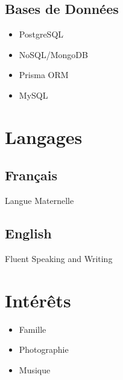 \documentclass{article}
\begin{document}
\begin{paracol}{2}
\begin{leftcolumn}
    \subsection{Bases de Données}
    \begin{itemize}
      \item PostgreSQL
      \item NoSQL/MongoDB
      \item Prisma ORM
      \item MySQL
    \end{itemize}

    \section{Langages}

    \subsection{Français}
    Langue Maternelle

    \vspace{0.5em}

    \subsection{English}
    Fluent Speaking and Writing

    \section{Intérêts}

    \begin{itemize}
      \item Famille
      \item Photographie
      \item Musique
    \end{itemize}


  \end{leftcolumn}
  \begin{rightcolumn}


\end{rightcolumn}
\end{paracol}
\end{document}
